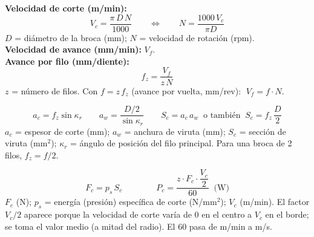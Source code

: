 \documentclass[12pt,a4paper]{article}
\begin{document}
\begin{formu}
	\textbf{Velocidad de corte (m/min):}
	\[ V_c = \frac{\pi\, D\, N}{1000} \qquad\Longleftrightarrow\qquad N =
		\frac{1000\,V_c}{\pi D} \]
	$D$ = diámetro de la broca (mm); $N$ = velocidad de rotación (rpm).\\[4pt]
	\textbf{Velocidad de avance (mm/min):} $V_f$.\\[4pt]
	\textbf{Avance por filo (mm/diente):}
	\[ f_z = \frac{V_f}{z\, N} \]
	$z$ = número de filos. Con $f = z\,f_z$ (avance por vuelta, mm/rev): $\;V_f =
		f\cdot N$.
\end{formu}

\begin{formu}
	\[ a_c = f_z \sin\kappa_r \qquad a_w = \frac{D/2}{\sin\kappa_r} \qquad S_c =
		a_c\, a_w \;\;\text{o también}\;\; S_c = f_z\,\frac{D}{2} \]
	$a_c$ = espesor de corte (mm); $a_w$ = anchura de viruta (mm); $S_c$ = sección
	de viruta (mm$^2$); $\kappa_r$ = ángulo de posición del filo principal. Para
	una broca de 2 filos, $f_z = f/2$.
\end{formu}

\begin{formu}
	\[ F_c = p_s\, S_c \qquad\qquad P_c = \frac{z\cdot F_c\cdot \dfrac{V_c}{2}}{60}
		\;\;\text{(W)} \]
	$F_c$ (N); $p_s$ = energía (presión) específica de corte (N/mm$^2$); $V_c$
	(m/min). El factor $V_c/2$ aparece porque la velocidad de corte varía de 0 en
	el
	centro a $V_c$ en el borde; se toma el valor medio (a mitad del radio). El 60
	pasa de m/min a m/s.
\end{formu}
\end{document}
